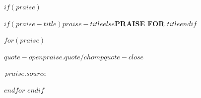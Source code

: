 $if(praise)$
\pagestyle{empty}
\vspace*{36pt}
{\centering\chapterheadingfont\bfseries\large{}\MakeTextUppercase{$if(praise-title)$$praise-title$$else$Praise for \emph{$title$}$endif$}\par}
\vspace{30pt}

\begingroup
\primaryfont\normalsize
\setlength{\parindent}{0pt}
$for(praise)$
\noindent\begin{minipage}{\textwidth}
\setlength{\parskip}{6pt}
$quote-open$$praise.quote/chomp$$quote-close$\par
\vspace{4pt}
{\raggedleft\textemdash\,\textsc{$praise.source$}\par}
\end{minipage}
\par\vspace{20pt plus 8pt}
$endfor$
\endgroup
$endif$
